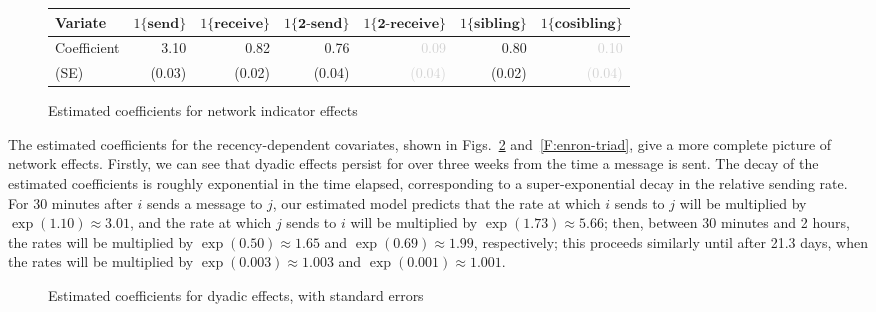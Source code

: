 \documentclass[final]{statsoc}
\begin{document}
\begin{figure}
\centering
\footnotesize
\begin{tabular}{lrrrrrr}
\toprule
Variate
& $1\{\textbf{send}\}$
& $1\{\textbf{receive}\}$
& $1\{\textbf{2-send}\}$
& $1\{\textbf{2-receive}\}$
& $1\{\textbf{sibling}\}$
& $1\{\textbf{cosibling}\}$
\\
\midrule
Coefficient
& 3.10
& 0.82
& 0.76
& \textcolor{LightGray}{0.09}
& 0.80
& \textcolor{LightGray}{0.10}
\\
(SE)
& \tiny{(0.03)}
& \tiny{(0.02)}
& \tiny{(0.04)}
& \textcolor{LightGray}{\tiny{(0.04)}}
& \tiny{(0.02)}
& \textcolor{LightGray}{\tiny{(0.04)}}
\\
\bottomrule
\end{tabular}
\normalsize
\caption{Estimated coefficients for network indicator effects}
\label{F:enron-net-indicator}
\end{figure}

The estimated coefficients for the recency-dependent covariates, shown in
Figs.~\ref{F:enron-dyad} and~\ref{F:enron-triad}, give a more complete
picture of network effects.  Firstly, we can see that dyadic effects
persist for over three weeks from the time a message is sent.  The decay of
the estimated coefficients is roughly exponential in the time elapsed,
corresponding to a super-exponential decay in the relative sending rate.  For 30
minutes after $i$ sends a message to $j$, our estimated model predicts that
the rate at which $i$ sends to $j$ will be multiplied by $\exp(1.10) \approx
3.01$, and the rate at which $j$ sends to $i$ will be multiplied by $\exp(1.73)
\approx 5.66$; then, between 30 minutes and 2 hours, the rates will be
multiplied by $\exp(0.50) \approx 1.65$ and $\exp(0.69) \approx 1.99$,
respectively; this proceeds similarly until after 21.3 days, when the rates
will be multiplied by $\exp(0.003) \approx 1.003$ and $\exp(0.001) \approx
1.001$.

\begin{figure}
  \centering
  \caption{Estimated coefficients for dyadic effects, with standard errors}
  \label{F:enron-dyad}
\end{figure}
\end{document}
